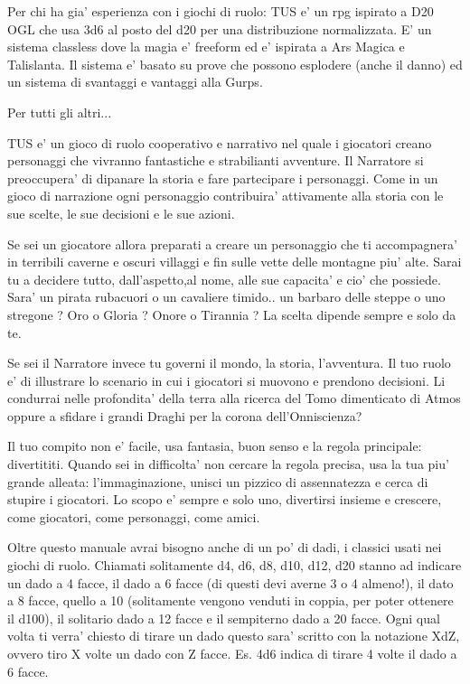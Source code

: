 \documentclass[a4paper,11pt,twoside,openany]{book}
\begin{document}
Per chi ha gia' esperienza con i giochi di ruolo: TUS e' un rpg ispirato a D20 OGL che usa 3d6 al posto del d20 per una distribuzione normalizzata. E' un sistema classless dove la magia e' freeform ed e' ispirata a Ars Magica e Talislanta. Il sistema e' basato su prove che possono esplodere (anche il danno) ed un sistema di svantaggi e vantaggi alla Gurps. 

Per tutti gli altri...

TUS e' un gioco di ruolo cooperativo e narrativo nel quale i giocatori creano personaggi che vivranno fantastiche e strabilianti avventure. Il Narratore si preoccupera' di dipanare la storia e fare partecipare i personaggi. Come in un gioco di narrazione ogni personaggio contribuira' attivamente alla storia con le sue scelte, le sue decisioni e le sue azioni.

Se sei un giocatore allora preparati a creare un personaggio che ti accompagnera' in terribili caverne e oscuri villaggi e fin sulle vette delle montagne piu' alte. Sarai tu a decidere tutto, dall'aspetto,al nome, alle sue capacita' e cio' che possiede. Sara' un pirata rubacuori o un cavaliere timido.. un barbaro delle steppe o uno stregone ? Oro o Gloria ? Onore o Tirannia ? La scelta dipende sempre e solo da te.

Se sei il Narratore invece tu governi il mondo, la storia, l'avventura. Il tuo ruolo e' di illustrare lo scenario in cui i giocatori si muovono e prendono decisioni. Li condurrai nelle profondita' della terra alla ricerca del Tomo dimenticato di Atmos oppure a sfidare i grandi Draghi per la corona dell'Onniscienza?

Il tuo compito non e' facile, usa fantasia, buon senso e la regola principale: divertititi. Quando sei in difficolta' non cercare la regola precisa, usa la tua piu' grande alleata: l'immaginazione, unisci un pizzico di assennatezza e cerca di stupire i giocatori. Lo scopo e' sempre e solo uno, divertirsi insieme e crescere, come giocatori, come personaggi, come amici.

Oltre questo manuale avrai bisogno anche di un po' di dadi, i classici usati nei giochi di ruolo.
Chiamati solitamente d4, d6, d8, d10, d12, d20 stanno ad indicare un dado a 4 facce, il dado a 6 facce (di questi devi averne 3 o 4 almeno!), il dato a 8 facce, quello a 10 (solitamente vengono venduti in coppia, per poter ottenere il d100), il solitario dado a 12 facce e il sempiterno dado a 20 facce.
Ogni qual volta ti verra' chiesto di tirare un dado questo sara' scritto con la notazione XdZ, ovvero tiro X volte un dado con Z facce. Es. 4d6 indica di tirare 4 volte il dado a 6 facce.
\end{document}
